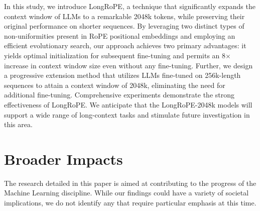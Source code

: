 In this study, we introduce LongRoPE, a technique that significantly expands the context window of LLMs to a remarkable 2048k tokens, while preserving their original performance on shorter sequences. By leveraging two distinct types of non-uniformities present in RoPE positional embeddings and employing an efficient evolutionary search, our approach achieves two primary advantages: it yields optimal initialization for subsequent fine-tuning and permits an 8$\times$ increase in context window size even without any fine-tuning. Further, we design a progressive extension method that utilizes LLMs fine-tuned on 256k-length sequences to attain a context window of 2048k, eliminating the need for additional fine-tuning. Comprehensive experiments demonstrate the strong effectiveness of LongRoPE. We anticipate that the LongRoPE-2048k models will support a wide range of long-context tasks and stimulate future investigation in this area.

\section*{Broader Impacts} The research detailed in this paper is aimed at contributing to the progress of the Machine Learning discipline. While our findings could have a variety of societal implications, we do not identify any that require particular emphasis at this time.

	\balance

